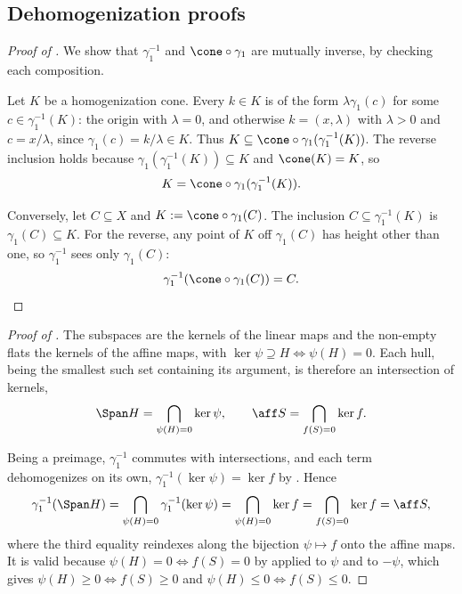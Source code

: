 \documentclass{article}
\theoremstyle{plain}
\theoremstyle{definition}
\theoremstyle{remark}
\begin{document}
\subsection{Dehomogenization proofs}
\label{loc:appendix.dehomogenization_proofs}
\begin{proof}[\hypertarget{loc:dehomogenization_is_a_bijection_between_sets_and_homogenization_cones.proof}{}Proof of ]

We show that $\gamma_1^{-1}$ and $\cone\circ\gamma_1$ are mutually inverse, by checking each composition.

Let $K$ be a homogenization cone. Every $k \in K$ is of the form $\lambda\gamma_1(c)$ for some $c \in \gamma_1^{-1}(K)$:
the origin with $\lambda = 0$, and otherwise $k = (x,\lambda)$ with $\lambda > 0$ and $c = x/\lambda$,
since $\gamma_1(c) = k/\lambda \in K$. Thus $K \subseteq \cone\circ\gamma_1(\gamma_1^{-1}(K))$. The reverse inclusion
holds because $\gamma_1(\gamma_1^{-1}(K)) \subseteq K$ and $\cone(K) = K$, so
\begin{equation*}
K = \cone\circ\gamma_1(\gamma_1^{-1}(K)).
\end{equation*}

Conversely, let $C \subseteq X$ and $K := \cone\circ\gamma_1(C)$. The inclusion $C \subseteq \gamma_1^{-1}(K)$ is $\gamma_1(C) \subseteq K$. For the reverse, any point of $K$ off $\gamma_1(C)$ has height other than one, so $\gamma_1^{-1}$ sees only $\gamma_1(C)$:
\begin{equation*}
\gamma_1^{-1}(\cone\circ\gamma_1(C)) = C.
\end{equation*}
\end{proof}
\begin{proof}[\hypertarget{loc:span_dehomogenizes_to_the_affine_hull.proof}{}Proof of ]

The subspaces are the kernels of the linear maps and the non-empty flats the kernels of the affine maps, with $\ker \psi \supseteq H \iff \psi(H) = 0$. Each hull, being the smallest such set containing its argument, is therefore an intersection of kernels,
\begin{equation*}
\Span H = \bigcap_{\psi(H) = 0} \ker \psi, \qquad \aff S = \bigcap_{f(S) = 0} \ker f.
\end{equation*}

Being a preimage, $\gamma_1^{-1}$ commutes with intersections, and each term dehomogenizes on its own, $\gamma_1^{-1}(\ker \psi) = \ker f$ by . Hence
\begin{align*}
\gamma_1^{-1}(\Span H) = \bigcap_{\psi(H) = 0} \gamma_1^{-1}(\ker \psi)
= \bigcap_{\psi(H) = 0} \ker f
= \bigcap_{f(S) = 0} \ker f = \aff S,
\end{align*}
where the third equality reindexes along the bijection $\psi \mapsto f$ onto the affine maps. It is valid because $\psi(H) = 0 \iff f(S) = 0$ by  applied to $\psi$ and to $-\psi$, which gives $\psi(H) \ge 0 \iff f(S) \ge 0$ and $\psi(H) \le 0 \iff f(S) \le 0$.
\end{proof}
\end{document}
